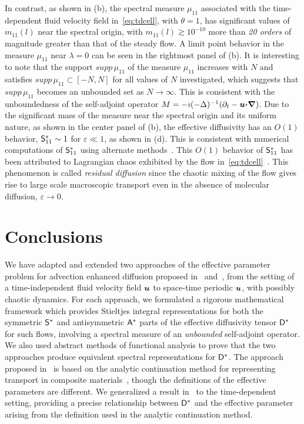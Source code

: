 \documentclass[amsa]{ipart}
\begin{document}
In contrast, as shown in (b),
the spectral measure $\mu_{11}$ associated with the time-dependent fluid
velocity field in~\eqref{eq:tdcell}, with $\theta=1$, has significant
values of $m_{11}(l)$ near the spectral origin, with
$m_{11}(l)\gtrsim10^{-10}$ more than \emph{20 orders} of magnitude greater
than  that of the steady flow. A limit point behavior in the measure
$\mu_{11}$ near $\lambda=0$ can be seen in the rightmost panel of
(b).  It is interesting to note
that the support $supp\,\mu_{11}$ of the measure $\mu_{11}$ increases with
$N$ and satisfies
$supp\,\mu_{11}\subset[-N,N]$ for all values of $N$ investigated, which
suggests that $supp\,\mu_{11}$ becomes an unbounded set
as $N\to\infty$. This is consistent with the unboundedness of the
self-adjoint operator $M=-\imath(-\Delta)^{-1}(\partial_t-\boldsymbol{u}\mbox{\boldmath${\cdot}$}\mbox{\boldmath${\nabla}$})$. Due to
the significant mass of the measure 
near the spectral origin and its uniform nature, as shown in the
center panel of 
(b), the effective diffusivity
has an $O(1)$ behavior, $\mathsf{S}^*_{11}\sim1$ for $\varepsilon\ll1$, as shown in
(d). This is consistent with 
numerical computations of $\mathsf{S}^*_{11}$ using alternate 
methods~\cite{Biferale:PF:2725}. This $O(1)$ behavior of $\mathsf{S}^*_{11}$
has been attributed to Lagrangian chaos exhibited by the
flow in~\eqref{eq:tdcell}~\cite{Biferale:PF:2725,ZCX_2015}. This
phenomenon is called \emph{residual diffusion} since the chaotic
mixing of the flow gives rise to large scale macroscopic transport
even in the absence of molecular diffusion, $\varepsilon\to0$. 




\section{Conclusions}
%
We have adapted and extended two approaches of the effective parameter
problem for advection enhanced diffusion proposed
in~\cite{Avellaneda:PRL-753,Avellaneda:CMP-339}
and~\cite{Pavliotis:PHD_Thesis}, from the setting of a
time-independent fluid velocity field $\boldsymbol{u}$ to space-time periodic
$\boldsymbol{u}$, with possibly chaotic dynamics. For each approach, we
formulated a rigorous mathematical framework which provides Stieltjes
integral representations for both the symmetric $\mathsf{S}^*$ and
antisymmetric $\mathsf{A}^*$ parts of the effective diffusivity tensor
$\mathsf{D}^*$ for such flows, involving a spectral measure of an
\emph{unbounded} self-adjoint operator. We also used abstract methods
of functional analysis to prove that the two approaches produce
equivalent spectral representations for $\mathsf{D}^*$. The approach proposed
in~\cite{Avellaneda:PRL-753,Avellaneda:CMP-339} is based on the
analytic continuation method for representing transport in composite
materials~\cite{Golden:CMP-473}, though the definitions of the
effective parameters are different. We generalized a result
in~\cite{Fannjiang:1994:SIAM_JAM:333} to the time-dependent setting,
providing a precise relationship between $\mathsf{D}^*$ and the effective
parameter arising from the definition used in the analytic
continuation method.   
\end{document}
